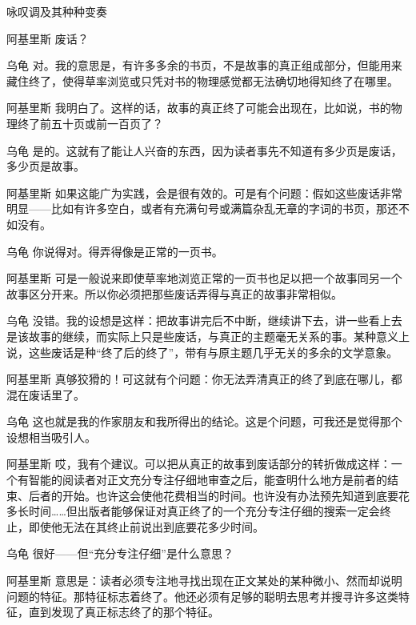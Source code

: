 \begin{dialog}{咏叹调及其种种变奏}
\begin{dialogue}
\item[阿基里斯]废话？

\item[乌龟]对。我的意思是，有许多多余的书页，不是故事的真正组成部分，但能用来藏住终了，使得草率浏览或只凭对书的物理感觉都无法确切地得知终了在哪里。

\item[阿基里斯]我明白了。这样的话，故事的真正终了可能会出现在，比如说，书的物理终了前五十页或前一百页了？

\item[乌龟]是的。这就有了能让人兴奋的东西，因为读者事先不知道有多少页是废话，多少页是故事。

\item[阿基里斯]如果这能广为实践，会是很有效的。可是有个问题：假如这些废话非常明显——比如有许多空白，或者有充满句号或满篇杂乱无章的字词的书页，那还不如没有。

\item[乌龟]你说得对。得弄得像是正常的一页书。

\item[阿基里斯]可是一般说来即使草率地浏览正常的一页书也足以把一个故事同另一个故事区分开来。所以你必须把那些废话弄得与真正的故事非常相似。

\item[乌龟]没错。我的设想是这样：把故事讲完后不中断，继续讲下去，讲一些看上去是该故事的继续，而实际上只是些废话，与真正的主题毫无关系的事。某种意义上说，这些废话是种“终了后的终了”，带有与原主题几乎无关的多余的文学意象。

\item[阿基里斯]真够狡猾的！可这就有个问题：你无法弄清真正的终了到底在哪儿，都混在废话里了。

\item[乌龟]这也就是我的作家朋友和我所得出的结论。这是个问题，可我还是觉得那个设想相当吸引人。

\item[阿基里斯]哎，我有个建议。可以把从真正的故事到废话部分的转折做成这样：一个有智能的阅读者对正文充分专注仔细地审查之后，能查明什么地方是前者的结束、后者的开始。也许这会使他花费相当的时间。也许没有办法预先知道到底要花多长时间……但出版者能够保证对真正终了的一个充分专注仔细的搜索一定会终止，即使他无法在其终止前说出到底要花多少时间。

\item[乌龟]很好——但“充分专注仔细”是什么意思？

\item[阿基里斯]意思是：读者必须专注地寻找出现在正文某处的某种微小、然而却说明问题的特征。那特征标志着终了。他还必须有足够的聪明去思考并搜寻许多这类特征，直到发现了真正标志终了的那个特征。


\end{dialogue}
\end{dialog}

